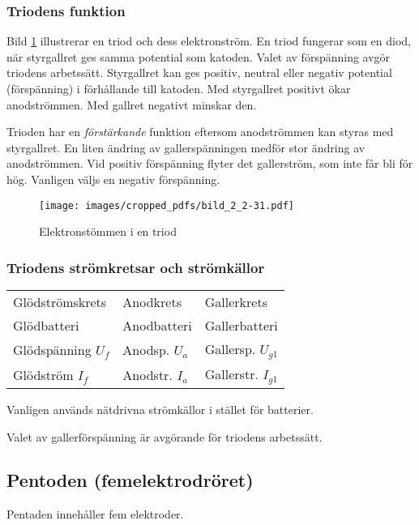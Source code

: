 \subsubsection{Triodens funktion}

Bild \ref{fig:BildII2-31} illustrerar en triod och dess elektronström.
En triod fungerar som en diod, när styrgallret ges samma potential som katoden.
Valet av förspänning avgör triodens arbetssätt.
Styrgallret kan ges positiv, neutral eller negativ potential (förspänning) i
förhållande till katoden.
Med styrgallret positivt ökar anodströmmen.
Med gallret negativt minskar den.

Trioden har en \emph{förstärkande} funktion eftersom anodströmmen kan styras med
styrgallret. En liten ändring av gallerspänningen medför stor ändring av
anodströmmen.
Vid positiv förspänning flyter det gallerström, som inte får bli för hög.
Vanligen väljs en negativ förspänning.

\begin{figure}[ht]
\texttt{[image: images/cropped\_pdfs/bild\_2\_2-31.pdf]}
\caption{Elektronstömmen i en triod}
\label{fig:BildII2-31}
\end{figure}

\subsubsection{Triodens strömkretsar och strömkällor}

\begin{tabular}{lll}
Glödströmskrets      & Anodkrets        &  Gallerkrets \\
Glödbatteri          & Anodbatteri      &  Gallerbatteri \\
Glödspänning \(U_f\) & Anodsp. \(U_a\)  &  Gallersp. \(U_{g1}\) \\
Glödström \(I_f\)    & Anodstr. \(I_a\) &  Gallerstr. \(I_{g1}\) \\
\end{tabular}

Vanligen används nätdrivna strömkällor i stället för batterier.

Valet av gallerförspänning är avgörande för triodens arbetssätt.

\subsection{Pentoden (femelektrodröret)}

Pentaden innehåller fem elektroder.

